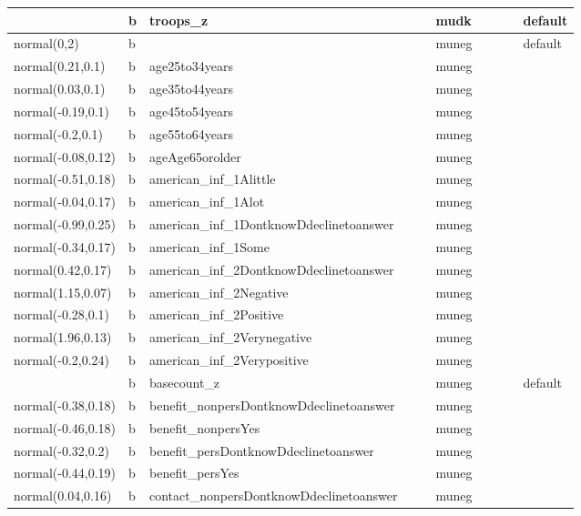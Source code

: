 \documentclass[
]{book}
\theoremstyle{definition}
\theoremstyle{definition}
\theoremstyle{definition}
\theoremstyle{definition}
\theoremstyle{remark}
\begin{document}
\begin{table}
\begin{tabular}[t]{l|l|l|l|l|l|l|l|l|l}
\hline
 & b & troops\_z &  &  & mudk &  &  &  & default\\
\hline
normal(0,2) & b &  &  &  & muneg &  &  &  & default\\
\hline
normal(0.21,0.1) & b & age25to34years &  &  & muneg &  &  &  & \\
\hline
normal(0.03,0.1) & b & age35to44years &  &  & muneg &  &  &  & \\
\hline
normal(-0.19,0.1) & b & age45to54years &  &  & muneg &  &  &  & \\
\hline
normal(-0.2,0.1) & b & age55to64years &  &  & muneg &  &  &  & \\
\hline
normal(-0.08,0.12) & b & ageAge65orolder &  &  & muneg &  &  &  & \\
\hline
normal(-0.51,0.18) & b & american\_inf\_1Alittle &  &  & muneg &  &  &  & \\
\hline
normal(-0.04,0.17) & b & american\_inf\_1Alot &  &  & muneg &  &  &  & \\
\hline
normal(-0.99,0.25) & b & american\_inf\_1DontknowDdeclinetoanswer &  &  & muneg &  &  &  & \\
\hline
normal(-0.34,0.17) & b & american\_inf\_1Some &  &  & muneg &  &  &  & \\
\hline
normal(0.42,0.17) & b & american\_inf\_2DontknowDdeclinetoanswer &  &  & muneg &  &  &  & \\
\hline
normal(1.15,0.07) & b & american\_inf\_2Negative &  &  & muneg &  &  &  & \\
\hline
normal(-0.28,0.1) & b & american\_inf\_2Positive &  &  & muneg &  &  &  & \\
\hline
normal(1.96,0.13) & b & american\_inf\_2Verynegative &  &  & muneg &  &  &  & \\
\hline
normal(-0.2,0.24) & b & american\_inf\_2Verypositive &  &  & muneg &  &  &  & \\
\hline
 & b & basecount\_z &  &  & muneg &  &  &  & default\\
\hline
normal(-0.38,0.18) & b & benefit\_nonpersDontknowDdeclinetoanswer &  &  & muneg &  &  &  & \\
\hline
normal(-0.46,0.18) & b & benefit\_nonpersYes &  &  & muneg &  &  &  & \\
\hline
normal(-0.32,0.2) & b & benefit\_persDontknowDdeclinetoanswer &  &  & muneg &  &  &  & \\
\hline
normal(-0.44,0.19) & b & benefit\_persYes &  &  & muneg &  &  &  & \\
\hline
normal(0.04,0.16) & b & contact\_nonpersDontknowDdeclinetoanswer &  &  & muneg &  &  &  & \\

\end{tabular}
\end{table}
\end{document}
